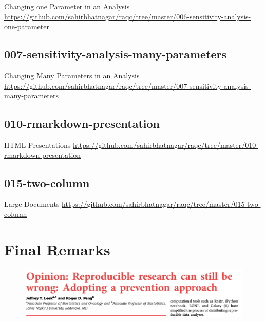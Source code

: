 \documentclass[10pt]{beamer}\usepackage[]{graphicx}\usepackage[]{color}
\begin{document}
\begin{frame}{Changing one Parameter in an Analysis}
\href{https://github.com/sahirbhatnagar/raqc/tree/master/006-sensitivity-analysis-one-parameter}{https://github.com/sahirbhatnagar/raqc/tree/master/006-sensitivity-analysis-one-parameter}
\end{frame}

\subsection{007-sensitivity-analysis-many-parameters}

\begin{frame}{Changing Many Parameters in an Analysis}
\href{https://github.com/sahirbhatnagar/raqc/tree/master/007-sensitivity-analysis-many-parameters}{https://github.com/sahirbhatnagar/raqc/tree/master/007-sensitivity-analysis-many-parameters}
\end{frame}


\subsection{010-rmarkdown-presentation}

\begin{frame}{HTML Presentations}
\href{https://github.com/sahirbhatnagar/raqc/tree/master/010-rmarkdown-presentation}{https://github.com/sahirbhatnagar/raqc/tree/master/010-rmarkdown-presentation}
\end{frame}

\subsection{015-two-column}

\begin{frame}{Large Documents}
\href{https://github.com/sahirbhatnagar/raqc/tree/master/015-two-column}{https://github.com/sahirbhatnagar/raqc/tree/master/015-two-column}
\end{frame}





\section{Final Remarks}

\begin{frame}
\begin{figure}[h!]
\centering
\includegraphics[scale=0.30, keepaspectratio]{./leek}
\end{figure}
\end{frame}
\end{document}

